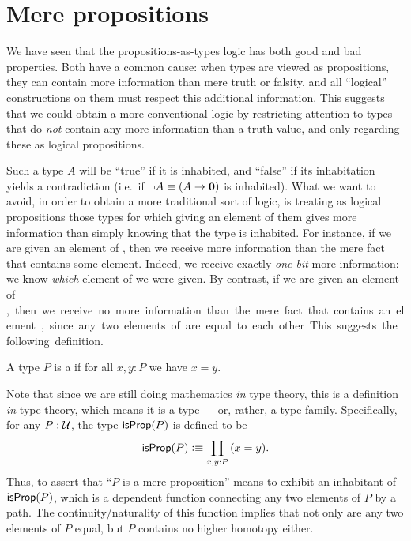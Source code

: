 \section{Mere propositions}
\label{subsec:hprops}

%
%
%
We have seen that the propositions-as-types logic has both good and bad properties.
Both have a common cause: when types are viewed as propositions, they can contain more information than mere truth or falsity, and all ``logical'' constructions on them must respect this additional information.
This suggests that we could obtain a more conventional logic by restricting attention to types that do \emph{not} contain any more information than a truth value, and only regarding these as logical propositions.

Such a type $A$ will be ``true'' if it is inhabited, and ``false'' if its inhabitation yields a contradiction (i.e.\ if $\neg A \equiv (A\to\mathbf{0})$ is inhabited).
%
What we want to avoid, in order to obtain a more traditional sort of logic, is treating as logical propositions those types for which giving an element of them gives more information than simply knowing that the type is inhabited.
For instance, if we are given an element of \bool, then we receive more information than the mere fact that \bool contains some element.
Indeed, we receive exactly \emph{one bit}
%
more information: we know \emph{which} element of \bool we were given.
By contrast, if we are given an element of \unit, then we receive no more information than the mere fact that \unit contains an element, since any two elements of \unit are equal to each other.
This suggests the following definition.

\begin{defn}\label{defn:isprop}
  A type $P$ is a 
  if for all $x,y:P$ we have $x=y$.
\end{defn}

Note that since we are still doing mathematics \emph{in} type theory, this is a definition \emph{in} type theory, which means it is a type --- or, rather, a type family.
Specifically, for any $P:\mathcal{U}$, the type $\mathsf{isProp}(P)$ is defined to be
\[ \isprop(P) \defeq \prd{x,y:P} (x=y). \]
Thus, to assert that ``$P$ is a mere proposition'' means to exhibit an inhabitant of $\mathsf{isProp}(P)$, which is a dependent function connecting any two elements of $P$ by a path.
The continuity/naturality of this function implies that not only are any two elements of $P$ equal, but $P$ contains no higher homotopy either.

